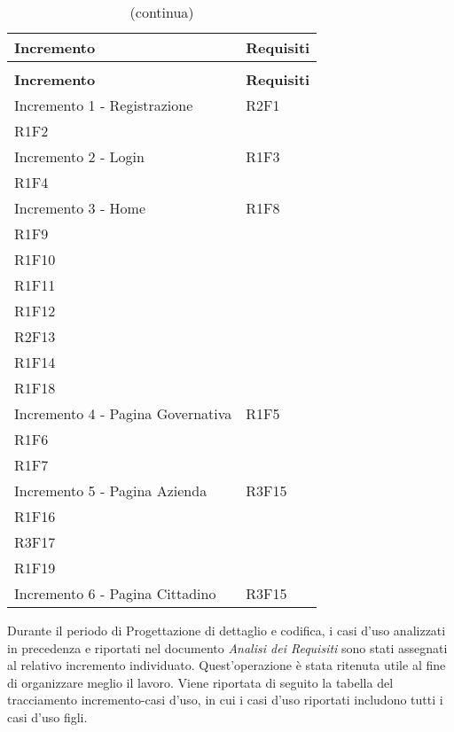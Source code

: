 
\renewcommand{\arraystretch}{1.5}
\begin{longtable}{ >{\centering}p{}
		>{\centering}p{}}
	\caption{Tabella di tracciamento incremento-requisiti}\\
	\rowcolorhead 
	\textbf{\color{white}Incremento}
	& \textbf{\color{white}Requisiti} 
	\tabularnewline 	
	\endfirsthead
	\rowcolor{white}\caption[]{(continua)} \\
	\rowcolorhead 
	\textbf{\color{white}Incremento}
	& \textbf{\color{white}Requisiti} 
	\tabularnewline 
	\endhead

	Incremento 1 - Registrazione	&	R2F1 \\
	R1F2	\tabularnewline
	Incremento 2 - Login	&	R1F3 \\
	R1F4	\tabularnewline
	Incremento 3 - Home	&	R1F8 \\
	R1F9 \\
	R1F10 \\
	R1F11 \\
	R1F12 \\
	R2F13 \\
	R1F14 \\
	R1F18 	\tabularnewline
	Incremento 4 - Pagina Governativa	&	R1F5 \\
	R1F6 \\
	R1F7	\tabularnewline
	Incremento 5 - Pagina Azienda	&	R3F15 \\
	R1F16 \\
	R3F17 \\
	R1F19	\tabularnewline
	Incremento 6 - Pagina Cittadino	&	R3F15	\tabularnewline
	
\end{longtable}

Durante il periodo di Progettazione di dettaglio e codifica, i casi d'uso 
analizzati in precedenza e riportati nel documento \textit{Analisi dei Requisiti}
sono stati assegnati al relativo incremento individuato. Quest'operazione è stata 
ritenuta utile al fine di organizzare meglio il lavoro. Viene riportata di seguito 
la tabella del tracciamento incremento-casi d'uso, in cui i casi d'uso riportati 
includono tutti i casi d'uso figli.


